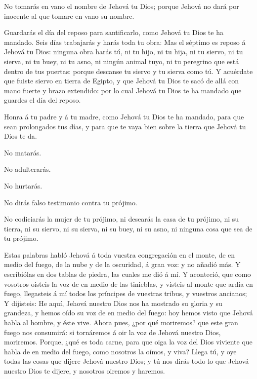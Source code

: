  No tomarás en vano el nombre de Jehová tu Dios; porque
Jehová no dará por inocente al que tomare en vano su nombre.

 Guardarás el día del reposo para santificarlo, como Jehová
tu Dios te ha mandado.  Seis días trabajarás y harás toda
tu obra:  Mas el séptimo es reposo á Jehová tu Dios:
ninguna obra harás tú, ni tu hijo, ni tu hija, ni tu siervo, ni tu
sierva, ni tu buey, ni tu asno, ni ningún animal tuyo, ni tu peregrino
que está dentro de tus puertas: porque descanse tu siervo y tu sierva
como tú.  Y acuérdate que fuiste siervo en tierra de
Egipto, y que Jehová tu Dios te sacó de allá con mano fuerte y brazo
extendido: por lo cual Jehová tu Dios te ha mandado que guardes el día
del reposo.

 Honra á tu padre y á tu madre, como Jehová tu Dios te ha
mandado, para que sean prolongados tus días, y para que te vaya bien
sobre la tierra que Jehová tu Dios te da.

 No matarás.

 No adulterarás.

 No hurtarás.

 No dirás falso testimonio contra tu prójimo.

 No codiciarás la mujer de tu prójimo, ni desearás la casa
de tu prójimo, ni su tierra, ni su siervo, ni su sierva, ni su buey, ni
su asno, ni ninguna cosa que sea de tu prójimo.

 Estas palabras habló Jehová á toda vuestra congregación en
el monte, de en medio del fuego, de la nube y de la oscuridad, á gran
voz: y no añadió más. Y escribiólas en dos tablas de piedra, las cuales
me dió á mí.  Y aconteció, que como vosotros oisteis la voz
de en medio de las tinieblas, y visteis al monte que ardía en fuego,
llegasteis á mí todos los príncipes de vuestras tribus, y vuestros
ancianos;  Y dijisteis: He aquí, Jehová nuestro Dios nos ha
mostrado su gloria y su grandeza, y hemos oído su voz de en medio del
fuego: hoy hemos visto que Jehová habla al hombre, y éste vive.
 Ahora pues, ¿por qué moriremos? que este gran fuego nos
consumirá: si tornáremos á oir la voz de Jehová nuestro Dios, moriremos.
 Porque, ¿qué es toda carne, para que oiga la voz del Dios
viviente que habla de en medio del fuego, como nosotros la oímos, y
viva?  Llega tú, y oye todas las cosas que dijere Jehová
nuestro Dios; y tú nos dirás todo lo que Jehová nuestro Dios te dijere,
y nosotros oiremos y haremos.

